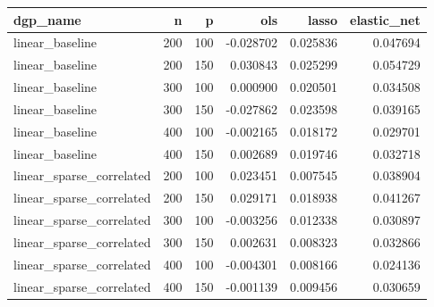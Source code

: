 \begin{table}[!htbp]
\centering
\begin{tabular}{lrrrrr}
 \hline
dgp\_name & n & p & ols & lasso & elastic\_net \\
 \hline
linear\_baseline & 200 & 100 & -0.028702 & 0.025836 & 0.047694 \\
linear\_baseline & 200 & 150 & 0.030843 & 0.025299 & 0.054729 \\
linear\_baseline & 300 & 100 & 0.000900 & 0.020501 & 0.034508 \\
linear\_baseline & 300 & 150 & -0.027862 & 0.023598 & 0.039165 \\
linear\_baseline & 400 & 100 & -0.002165 & 0.018172 & 0.029701 \\
linear\_baseline & 400 & 150 & 0.002689 & 0.019746 & 0.032718 \\
linear\_sparse\_correlated & 200 & 100 & 0.023451 & 0.007545 & 0.038904 \\
linear\_sparse\_correlated & 200 & 150 & 0.029171 & 0.018938 & 0.041267 \\
linear\_sparse\_correlated & 300 & 100 & -0.003256 & 0.012338 & 0.030897 \\
linear\_sparse\_correlated & 300 & 150 & 0.002631 & 0.008323 & 0.032866 \\
linear\_sparse\_correlated & 400 & 100 & -0.004301 & 0.008166 & 0.024136 \\
linear\_sparse\_correlated & 400 & 150 & -0.001139 & 0.009456 & 0.030659 \\
 \hline
\end{tabular}
\end{table}
